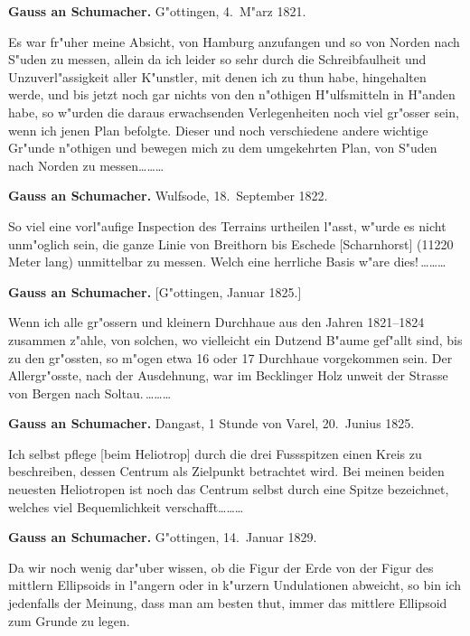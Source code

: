 \documentclass[12pt,a4paper]{article}
\theoremstyle{plain}
\theoremstyle{definition}
\theoremstyle{remark}
\begin{document}
\medskip
\noindent \textbf{Gauss an Schumacher.} G"ottingen, 4.~M"arz 1821.

\medskip
\noindent Es war fr"uher meine Absicht, von Hamburg anzufangen und so von Norden nach S"uden zu messen, allein da ich leider so sehr durch die Schreibfaulheit und Unzuverl"assigkeit aller K"unstler, mit denen ich zu thun habe, hingehalten werde, und bis jetzt noch gar nichts von den n"othigen H"ulfsmitteln in H"anden habe, so w"urden die daraus erwachsenden Verlegenheiten noch viel gr"osser sein, wenn ich jenen Plan befolgte. Dieser und noch verschiedene andere wichtige Gr"unde n"othigen und bewegen mich zu dem umgekehrten Plan, von S"uden nach Norden zu messen\ldots\ldots\ldots

\newpage
\noindent \textbf{Gauss an Schumacher.} Wulfsode, 18.~September 1822.

\medskip
\noindent So viel eine vorl"aufige Inspection des Terrains urtheilen l"asst, w"urde es nicht unm"oglich sein, die ganze Linie von Breithorn bis Eschede [Scharnhorst] (11220 Meter lang) unmittelbar zu messen. Welch eine herrliche Basis w"are dies!\,\ldots\ldots\ldots

\medskip
\noindent \textbf{Gauss an Schumacher.} [G"ottingen, Januar 1825.]

\medskip
\noindent Wenn ich alle gr"ossern und kleinern Durchhaue aus den Jahren 1821--1824 zusammen z"ahle, von solchen, wo vielleicht ein Dutzend B"aume gef"allt sind, bis zu den gr"ossten, so m"ogen etwa 16 oder 17 Durchhaue vorgekommen sein. Der Allergr"osste, nach der Ausdehnung, war im Becklinger Holz unweit der Strasse von Bergen nach Soltau.\,\ldots\ldots\ldots

\medskip
\noindent \textbf{Gauss an Schumacher.} Dangast, 1 Stunde von Varel, 20.~Junius 1825.

\medskip
\noindent Ich selbst pflege [beim Heliotrop] durch die drei Fussspitzen einen Kreis zu beschreiben, dessen Centrum als Zielpunkt betrachtet wird. Bei meinen beiden neuesten Heliotropen ist noch das Centrum selbst durch eine Spitze bezeichnet, welches viel Bequemlichkeit verschafft\ldots\ldots\ldots

\medskip
\noindent \textbf{Gauss an Schumacher.} G"ottingen, 14.~Januar 1829.

\medskip
\noindent Da wir noch wenig dar"uber wissen, ob die Figur der Erde von der Figur des mittlern Ellipsoids in l"angern oder in k"urzern Undulationen abweicht, so bin ich jedenfalls der Meinung, dass man am besten thut, immer das mittlere Ellipsoid zum Grunde zu legen.
\end{document}
